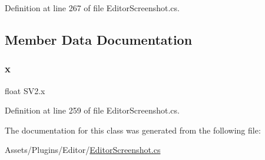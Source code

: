 Definition at line 267 of file Editor\+Screenshot.\+cs.



\subsection{Member Data Documentation}
\mbox{\label{class_s_v2_a9572dba95fd80c7f00d13af7a51d2299}} 
\subsubsection{\texorpdfstring{x}{x}}
{\footnotesize\ttfamily float S\+V2.\+x}



Definition at line 259 of file Editor\+Screenshot.\+cs.



The documentation for this class was generated from the following file\+:\begin{DoxyCompactItemize}
\item 
Assets/\+Plugins/\+Editor/\mbox{\hyperlink{_editor_screenshot_8cs}{Editor\+Screenshot.\+cs}}\end{DoxyCompactItemize}
